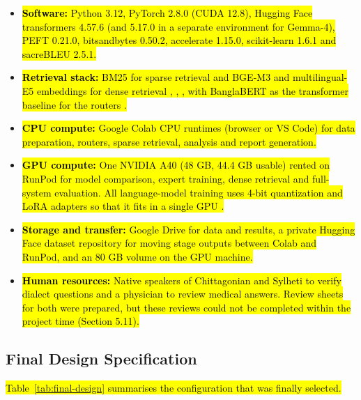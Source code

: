\begin{itemize}
\item \hl{\textbf{Software:} Python 3.12, PyTorch 2.8.0 (CUDA 12.8), Hugging
Face transformers 4.57.6 (and 5.17.0 in a separate environment for
Gemma-4), PEFT 0.21.0, bitsandbytes 0.50.2, accelerate 1.15.0,
scikit-learn 1.6.1 and sacreBLEU 2.5.1.}

\item \hl{\textbf{Retrieval stack:} BM25 for sparse retrieval and BGE-M3 and
multilingual-E5 embeddings for dense retrieval \cite{robertson2009bm25}, \cite{chen2024bgem3},
\cite{wang2024me5}, with BanglaBERT as the transformer baseline for the routers
\cite{bhattacharjee2022banglabert}.}

\item \hl{\textbf{CPU compute:} Google Colab CPU runtimes (browser or VS
Code) for data preparation, routers, sparse retrieval, analysis and
report generation.}

\item \hl{\textbf{GPU compute:} One NVIDIA A40 (48 GB, 44.4 GB usable)
rented on RunPod for model comparison, expert training, dense retrieval
and full-system evaluation. All language-model training uses 4-bit
quantization and LoRA adapters so that it fits in a single GPU
\cite{dettmers2023qlora}.}

\item \hl{\textbf{Storage and transfer:} Google Drive for data and results,
a private Hugging Face dataset repository for moving stage outputs
between Colab and RunPod, and an 80 GB volume on the GPU machine.}

\item \hl{\textbf{Human resources:} Native speakers of Chittagonian and
Sylheti to verify dialect questions and a physician to review medical
answers. Review sheets for both were prepared, but these reviews could
not be completed within the project time (Section 5.11).}
\end{itemize}

\subsection{Final Design Specification}\label{final-design-specification}

\hl{Table~\ref{tab:final-design} summarises the configuration that was finally selected.}

